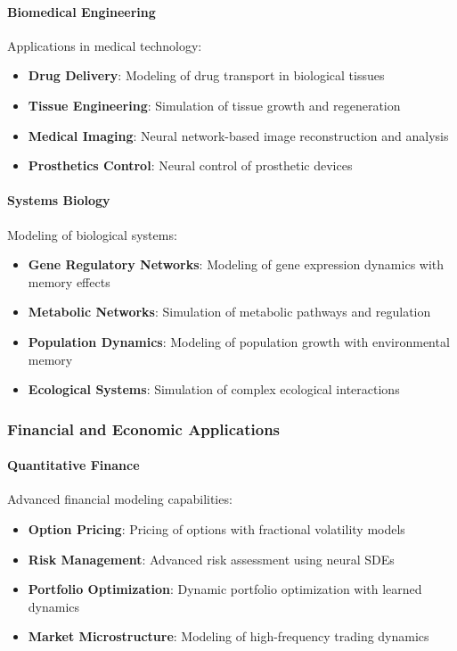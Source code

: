 \paragraph{Biomedical Engineering}
Applications in medical technology:

\begin{itemize}
    \item \textbf{Drug Delivery}: Modeling of drug transport in biological tissues
    \item \textbf{Tissue Engineering}: Simulation of tissue growth and regeneration
    \item \textbf{Medical Imaging}: Neural network-based image reconstruction and analysis
    \item \textbf{Prosthetics Control}: Neural control of prosthetic devices
\end{itemize}

\paragraph{Systems Biology}
Modeling of biological systems:

\begin{itemize}
    \item \textbf{Gene Regulatory Networks}: Modeling of gene expression dynamics with memory effects
    \item \textbf{Metabolic Networks}: Simulation of metabolic pathways and regulation
    \item \textbf{Population Dynamics}: Modeling of population growth with environmental memory
    \item \textbf{Ecological Systems}: Simulation of complex ecological interactions
\end{itemize}

\subsubsection{Financial and Economic Applications}

\paragraph{Quantitative Finance}
Advanced financial modeling capabilities:

\begin{itemize}
    \item \textbf{Option Pricing}: Pricing of options with fractional volatility models
    \item \textbf{Risk Management}: Advanced risk assessment using neural SDEs
    \item \textbf{Portfolio Optimization}: Dynamic portfolio optimization with learned dynamics
    \item \textbf{Market Microstructure}: Modeling of high-frequency trading dynamics
\end{itemize}

